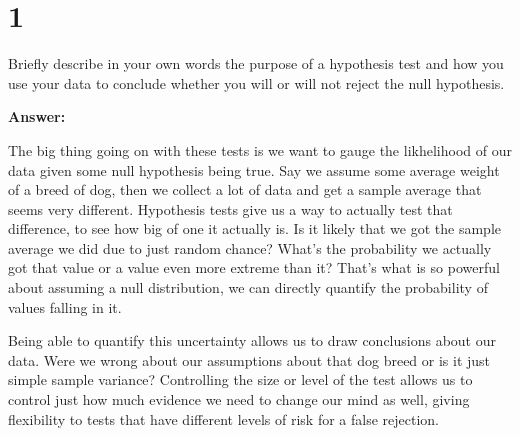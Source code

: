 \section{1}

Briefly describe in your own words the purpose of a hypothesis test and how you use your data to conclude whether you will or will not reject the null hypothesis.

\noindent\textbf{Answer:} 

The big thing going on with these tests is we want to gauge the likhelihood of our data given some null hypothesis being true. Say we assume some average weight of a breed of dog, then we collect a lot of data and get a sample average that seems very different. Hypothesis tests give us a way to actually test that difference, to see how big of one it actually is. Is it likely that we got the sample  average we did due to just random chance? What's the probability we actually got that value or a value even more extreme than it? That's what is so powerful about assuming a null distribution, we can directly quantify the probability of values falling in it.

Being able to quantify this uncertainty allows us to draw conclusions about our data. Were we wrong about our assumptions about that dog breed or is it just simple sample variance? Controlling the size or level of the test allows us to control just how much evidence we need to change our mind as well, giving flexibility to tests that have different levels of risk for a false rejection.

